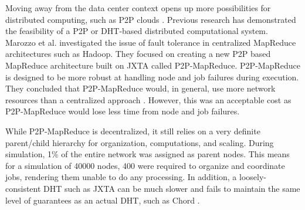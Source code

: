 \documentclass[10pt,conference]{IEEEtran}
\begin{document}
Moving away from the data center context opens up more possibilities for distributed computing, such as P2P clouds \cite{p2p-cloud}.
Previous research has demonstrated the feasibility of a P2P or DHT-based distributed computational system.
Marozzo et al. \cite{marozzo2012p2p} investigated the issue of fault tolerance in centralized MapReduce architectures such as Hadoop.  
They focused on creating a new P2P based MapReduce architecture built on JXTA \cite{jxta} called P2P-MapReduce.  
P2P-MapReduce is designed to be more robust at handling node and job failures during execution.
%
They concluded that P2P-MapReduce would, in general, use more network resources than a centralized approach \cite{marozzo2012p2p}. 
However, this was an acceptable cost as P2P-MapReduce would lose less time from node and job failures.

While P2P-MapReduce is decentralized, it still relies on a very definite parent/child hierarchy for organization, computations, and scaling. 
During simulation, 1\% of the entire network was assigned as parent nodes. This means for a simulation of 40000 nodes, 400 were required to organize and coordinate jobs, rendering them unable to do any processing.  
In addition, a loosely-consistent DHT such as JXTA \cite{5359174} can be much slower and fails to maintain the same level of guarantees as an actual DHT, such as Chord \cite{chord}.   




%
\end{document}
